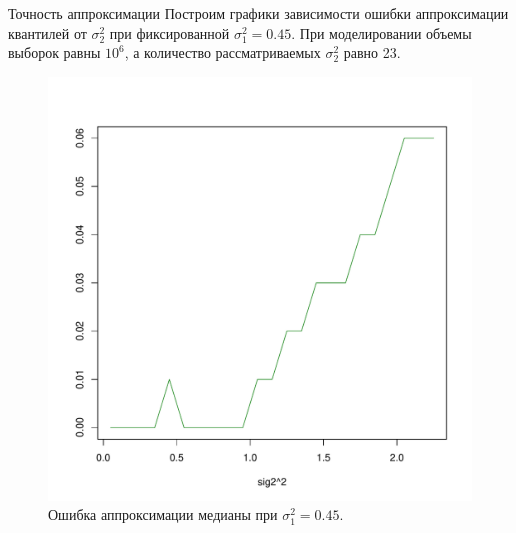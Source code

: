 \documentclass[ucs, notheorems, handout]{beamer}
\begin{document}
\begin{frame}{Точность аппроксимации }
	Построим графики зависимости ошибки аппроксимации квантилей от $\sigma_{2}^{2}$ при фиксированной $\sigma_{1}^{2} = 0.45$. При моделировании объемы выборок равны $10^{6}$, а количество рассматриваемых $\sigma_{2}^{2}$ равно 23.
	\begin{figure}[h]
		\begin{center}
			\begin{minipage}[h]{0.45\linewidth}
				\includegraphics[width=1\linewidth]{gr_new_1.pdf}
				\caption{Ошибка аппроксимации медианы при $\sigma_{1}^{2} = 0.45$.} %
				\label{ris7} %
			\end{minipage}
		\end{center}
	\end{figure}	
\end{frame}
\end{document}
